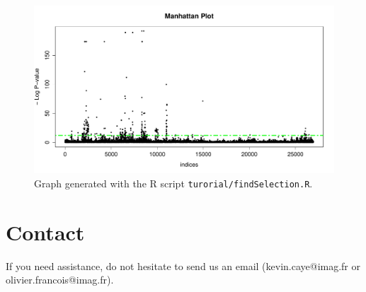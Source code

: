 \documentclass[10pt,a4paper]{article}
\begin{document}

\begin{figure}[h!]\centering
\includegraphics[width=\linewidth]{manhattanPlot.pdf}
\caption{Graph generated with the R script {\tt turorial/findSelection.R}.}
\end{figure} 

\section{Contact}
If you need assistance, do not hesitate to send us an email (kevin.caye@imag.fr or olivier.francois@imag.fr). 



\end{document}
